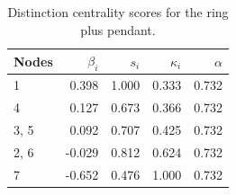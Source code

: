 \begin{table}
\centering
\caption{\label{tab:ringpendant}Distinction centrality scores for the ring plus pendant.}
\centering
\begin{tabular}[t]{lrrrr}
\toprule
Nodes & $\beta_i$ & $s_i$ & $\kappa_i$ & $\alpha$\\
\midrule
1 & 0.398 & 1.000 & 0.333 & 0.732\\
4 & 0.127 & 0.673 & 0.366 & 0.732\\
3, 5 & 0.092 & 0.707 & 0.425 & 0.732\\
2, 6 & -0.029 & 0.812 & 0.624 & 0.732\\
7 & -0.652 & 0.476 & 1.000 & 0.732\\
\bottomrule
\end{tabular}
\end{table}
